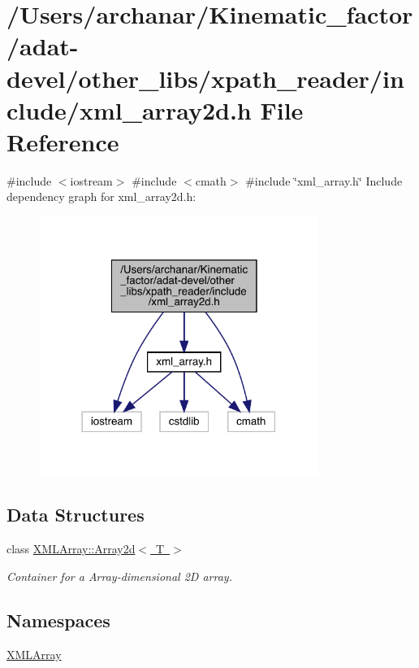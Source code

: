 \hypertarget{adat-devel_2other__libs_2xpath__reader_2include_2xml__array2d_8h}{}\section{/\+Users/archanar/\+Kinematic\+\_\+factor/adat-\/devel/other\+\_\+libs/xpath\+\_\+reader/include/xml\+\_\+array2d.h File Reference}
\label{adat-devel_2other__libs_2xpath__reader_2include_2xml__array2d_8h}
{\ttfamily \#include $<$iostream$>$}\newline
{\ttfamily \#include $<$cmath$>$}\newline
{\ttfamily \#include \char`\"{}xml\+\_\+array.\+h\char`\"{}}\newline
Include dependency graph for xml\+\_\+array2d.\+h\+:
\nopagebreak
\begin{figure}[H]
\begin{center}
\leavevmode
\includegraphics[width=258pt]{d8/d60/adat-devel_2other__libs_2xpath__reader_2include_2xml__array2d_8h__incl}
\end{center}
\end{figure}
\subsection*{Data Structures}
\begin{DoxyCompactItemize}
\item 
class \mbox{\hyperlink{classXMLArray_1_1Array2d}{X\+M\+L\+Array\+::\+Array2d$<$ T $>$}}
\begin{DoxyCompactList}\small\item\em Container for a Array-\/dimensional 2D array. \end{DoxyCompactList}\end{DoxyCompactItemize}
\subsection*{Namespaces}
\begin{DoxyCompactItemize}
\item 
 \mbox{\hyperlink{namespaceXMLArray}{X\+M\+L\+Array}}
\end{DoxyCompactItemize}
